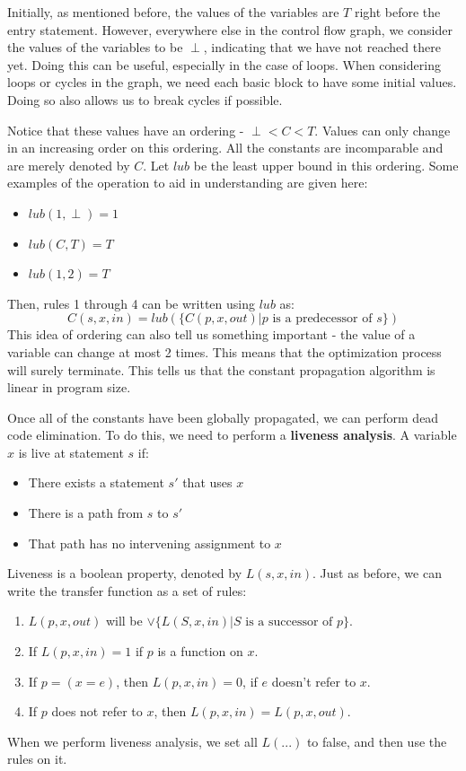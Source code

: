 \documentclass[12pt,letterpaper]{book}
\theoremstyle{definition}
\begin{document}
Initially, as mentioned before, the values of the variables are $T$ right before the entry statement. However, everywhere else in the control flow graph, we consider the values of the variables to be $\perp$, indicating that we have not reached there yet. Doing this can be useful, especially in the case of loops. When considering loops or cycles in the graph, we need each basic block to have some initial values. Doing so also allows us to break cycles if possible.

Notice that these values have an ordering - $\perp < C < T$. Values can only change in an increasing order on this ordering. All the constants are incomparable and are merely denoted by $C$. Let $lub$ be the least upper bound in this ordering. Some examples of the operation to aid in understanding are given here:
\begin{itemize}
  \item $lub(1, \perp) = 1$
  \item $lub(C,T) = T$
  \item $lub(1,2) = T$
\end{itemize}
Then, rules 1 through 4 can be written using $lub$ as:
\[C(s,x,in) = lub( \{ C(p,x,out) | p \text{ is a predecessor of }s\} )\]
This idea of ordering can also tell us something important - the value of a variable can change at most 2 times. This means that the optimization process will surely terminate. This tells us that the constant propagation algorithm is linear in program size.

Once all of the constants have been globally propagated, we can perform dead code elimination. To do this, we need to perform a \textbf{liveness analysis}. A variable $x$ is live at statement $s$ if:
\begin{itemize}
  \item There exists a statement $s'$ that uses $x$
  \item There is a path from $s$ to $s'$
  \item That path has no intervening assignment to $x$
\end{itemize}
Liveness is a boolean property, denoted by $L(s,x,in)$. Just as before, we can write the transfer function as a set of rules:
\begin{enumerate}
  \item $L(p,x,out)$ will be $\lor \{L(S,x,in) | S \text{ is a  successor of } p\}$.
  \item If $L(p,x,in) = 1$ if $p$ is a function on $x$.
  \item If $p = (x = e)$, then $L(p,x,in) = 0$, if $e$ doesn't refer to $x$.
  \item If $p$ does not refer to $x$, then $L(p,x,in) = L(p,x,out)$.
\end{enumerate}
When we perform liveness analysis, we set all $L(...)$ to false, and then use the rules on it.
\end{document}
